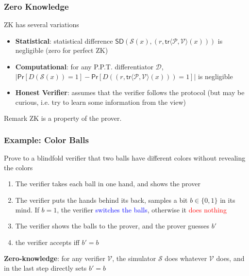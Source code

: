 \documentclass{beamer}
\newcommand{\blue}[1]{\textcolor{blue}{#1}}
\newcommand{\dgreen}[1]{\textcolor{dgreen}{#1}}
\newcommand{\red}[1]{\textcolor{red}{#1}}
\begin{document}
\frame
{
  \frametitle{Zero Knowledge}
  \onslide<+-> ZK has several variations
  \begin{itemize}
    \item<+-> \textbf{Statistical}: statistical difference $\mathsf{SD}(\mathcal{S}(x),(r,\mathsf{tr}\langle\mathcal{P},\mathcal{V}\rangle(x)))$ is negligible (zero for perfect ZK)
    \item<+-> \textbf{Computational}: for any P.P.T. differentiator $\mathcal{D}$, $|\mathsf{Pr}[D(\mathcal{S}(x))=1]-\mathsf{Pr}[D((r,\mathsf{tr}\langle\mathcal{P},\mathcal{V}\rangle(x)))=1]|$ is negligible
    \item<+-> \textbf{Honest Verifier}: assumes that the verifier follows the protocol (but may be curious, i.e. try to learn some information from the view)
  \end{itemize}

  \onslide<+->\begin{block}{Remark}
  ZK is a property of the prover.
  \end{block}
}

\frame
{
  \frametitle{Example: Color Balls}
  \onslide<+-> Prove to a blindfold verifier that two balls have different \dgreen{colors} without revealing the colors
  \begin{enumerate}
    \item<+-> The verifier takes each ball in one hand, and shows the prover
    \item<+-> The verifier puts the hands behind its back, samples a bit $b\in\{0,1\}$ in its mind. If $b=1$, the verifier \blue{switches the balls}, otherwise it \red{does nothing}
    \item<+-> The verifier shows the balls to the prover, and the prover guesses $b'$
    \item<+-> the verifier \dgreen{accepts iff $b'=b$}
  \end{enumerate}
  \onslide<+->\textbf{Zero-knowledge}: for any verifier $\mathcal{V}$, the simulator $\mathcal{S}$ does whatever $\mathcal{V}$ does, and in the last step directly sets $b'=b$
}
\end{document}
